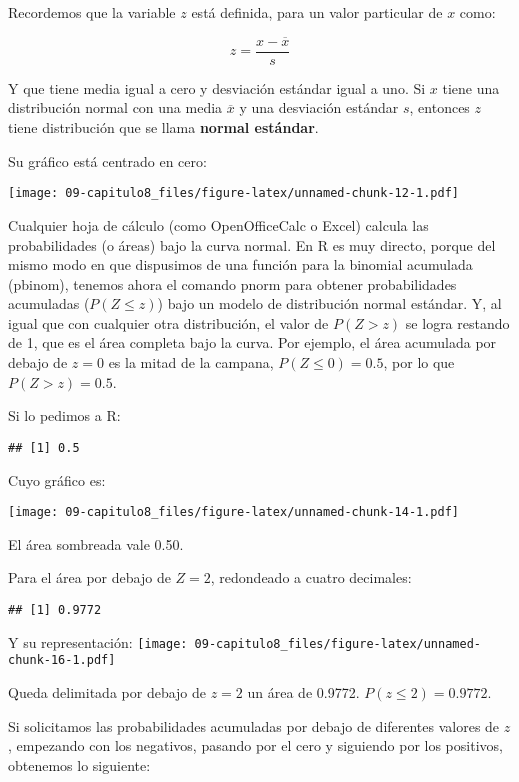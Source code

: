 \documentclass[]{article}
\begin{document}
Recordemos que la variable \(z\) está definida, para un valor particular
de \(x\) como:

\[z = \frac{x - \overline{x}}{s}\]

Y que tiene media igual a cero y desviación estándar igual a uno. Si
\(x\) tiene una distribución normal con una media \(\overline{x}\) y una
desviación estándar \(s\), entonces \(z\) tiene distribución que se
llama \textbf{normal estándar}.

Su gráfico está centrado en cero:

\texttt{[image: 09-capitulo8\_files/figure-latex/unnamed-chunk-12-1.pdf]}

Cualquier hoja de cálculo (como OpenOfficeCalc o Excel) calcula las
probabilidades (o áreas) bajo la curva normal. En R es muy directo,
porque del mismo modo en que dispusimos de una función para la binomial
acumulada (pbinom), tenemos ahora el comando pnorm para obtener
probabilidades acumuladas (\(P(Z\leq z)\)) bajo un modelo de
distribución normal estándar. Y, al igual que con cualquier otra
distribución, el valor de \(P(Z>z)\) se logra restando de 1, que es el
área completa bajo la curva. Por ejemplo, el área acumulada por debajo
de \(z=0\) es la mitad de la campana, \(P(Z\leq 0)=0.5\), por lo que
\(P(Z>z)=0.5\).

Si lo pedimos a R:

\begin{verbatim}
## [1] 0.5
\end{verbatim}

Cuyo gráfico es:

\texttt{[image: 09-capitulo8\_files/figure-latex/unnamed-chunk-14-1.pdf]}

El área sombreada vale 0.50.

Para el área por debajo de \(Z=2\), redondeado a cuatro decimales:

\begin{verbatim}
## [1] 0.9772
\end{verbatim}

Y su representación:
\texttt{[image: 09-capitulo8\_files/figure-latex/unnamed-chunk-16-1.pdf]}

Queda delimitada por debajo de \(z=2\) un área de 0.9772.
\(P(z\leq2)=0.9772\).

Si solicitamos las probabilidades acumuladas por debajo de diferentes
valores de \(z\), empezando con los negativos, pasando por el cero y
siguiendo por los positivos, obtenemos lo siguiente:
\end{document}
